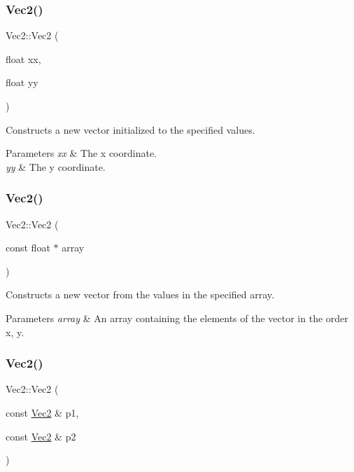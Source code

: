 \subsubsection{\texorpdfstring{Vec2()}{Vec2()}\hspace{0.1cm}{\footnotesize\ttfamily [2/9]}}
{\footnotesize\ttfamily Vec2\+::\+Vec2 (\begin{DoxyParamCaption}\item[{float}]{xx,  }\item[{float}]{yy }\end{DoxyParamCaption})\hspace{0.3cm}{\ttfamily [inline]}}

Constructs a new vector initialized to the specified values.


\begin{DoxyParams}{Parameters}
{\em xx} & The x coordinate. \\
\hline
{\em yy} & The y coordinate. \\
\hline
\end{DoxyParams}
\mbox{\label{classVec2_a469928d68a31daa0f3cd858e8b68701d}} 
\subsubsection{\texorpdfstring{Vec2()}{Vec2()}\hspace{0.1cm}{\footnotesize\ttfamily [3/9]}}
{\footnotesize\ttfamily Vec2\+::\+Vec2 (\begin{DoxyParamCaption}\item[{const float $\ast$}]{array }\end{DoxyParamCaption})\hspace{0.3cm}{\ttfamily [inline]}}

Constructs a new vector from the values in the specified array.


\begin{DoxyParams}{Parameters}
{\em array} & An array containing the elements of the vector in the order x, y. \\
\hline
\end{DoxyParams}
\mbox{\label{classVec2_aff34a0a8b960dcfbcc5ac1d8d3af3493}} 
\subsubsection{\texorpdfstring{Vec2()}{Vec2()}\hspace{0.1cm}{\footnotesize\ttfamily [4/9]}}
{\footnotesize\ttfamily Vec2\+::\+Vec2 (\begin{DoxyParamCaption}\item[{const \hyperlink{classVec2}{Vec2} \&}]{p1,  }\item[{const \hyperlink{classVec2}{Vec2} \&}]{p2 }\end{DoxyParamCaption})\hspace{0.3cm}{\ttfamily [inline]}}


